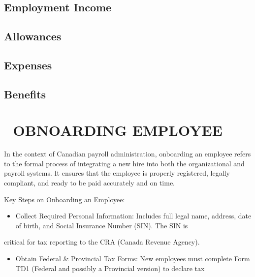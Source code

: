 \documentclass[letterpaper,10pt,english]{sphinxmanual}
\begin{document}
\section{Employment Income}
\label{\detokenize{compensation:employment-income}}

\section{Allowances}
\label{\detokenize{compensation:allowances}}

\section{Expenses}
\label{\detokenize{compensation:expenses}}

\section{Benefits}
\label{\detokenize{compensation:benefits}}
\sphinxstepscope


\chapter{🍁 OBNOARDING EMPLOYEE 🍁}
\label{\detokenize{onboarding_employee:obnoarding-employee}}\label{\detokenize{onboarding_employee::doc}}
\sphinxAtStartPar
In the context of Canadian payroll administration, onboarding an employee refers to the formal process of integrating a new hire into
both the organizational and payroll systems. It ensures that the employee is properly registered, legally compliant, and ready to be paid
accurately and on time.

\sphinxAtStartPar
Key Steps on Onboarding an Employee:
\begin{itemize}
\item {} 
\sphinxAtStartPar
Collect Required Personal Information: Includes full legal name, address, date of birth, and Social Insurance Number (SIN). The SIN is

\end{itemize}

\sphinxAtStartPar
critical for tax reporting to the CRA (Canada Revenue Agency).
\begin{itemize}
\item {} 
\sphinxAtStartPar
Obtain Federal \& Provincial Tax Forms: New employees must complete Form TD1 (Federal and possibly a Provincial version) to declare tax

\end{itemize}
\end{document}
